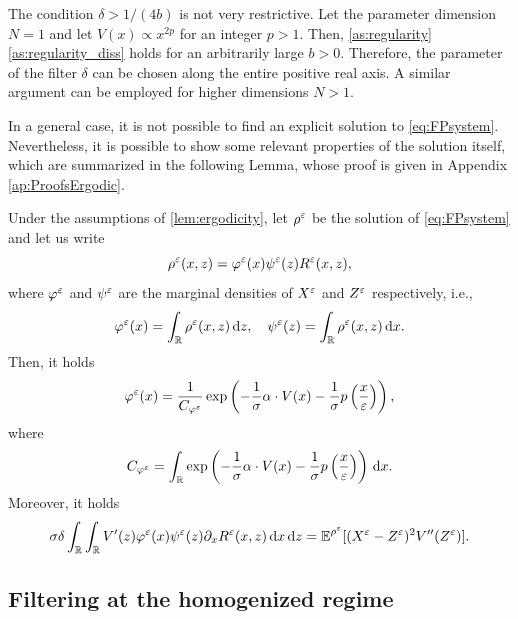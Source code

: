 \documentclass[review,onefignum,onetabnum]{siamonline190516}
\begin{document}
\begin{remark} The condition $\delta > 1 / (4b)$ is not very restrictive. Let the parameter dimension $N = 1$ and let $V(x) \propto x^{2p}$ for an integer $p > 1$. Then, \cref{as:regularity}\ref{as:regularity_diss} holds for an arbitrarily large $b > 0$. Therefore, the parameter of the filter $\delta$ can be chosen along the entire positive real axis. A similar argument can be employed for higher dimensions $N > 1$.
\end{remark}

In a general case, it is not possible to find an explicit solution to \eqref{eq:FPsystem}. Nevertheless, it is possible to show some relevant properties of the solution itself, which are summarized in the following Lemma, whose proof is given in Appendix \ref{ap:ProofsErgodic}.

\begin{lemma}\label{lem:FPMarginal} Under the assumptions of \cref{lem:ergodicity}, let $\rho^\varepsilon$ be the solution of \eqref{eq:FPsystem} and let us write 
\begin{equation}\label{eq:densityDecomposition}
	\rho^\epl(x, z) = \phi^\epl(x)\psi^\epl(z)R^\epl(x,z),
\end{equation}
where $\varphi^\varepsilon$ and $\psi^\varepsilon$ are the marginal densities of $X^\varepsilon$ and $Z^\varepsilon$ respectively, i.e., 
\begin{equation}
	\varphi^\varepsilon(x) = \int_{\mathbb{R}} \rho^\varepsilon(x,z) \,\mathrm{d} z, \quad  \psi^\varepsilon(z) = \int_{\mathbb{R}} \rho^\varepsilon(x,z) \,\mathrm{d} x.
\end{equation}
Then, it holds
\begin{equation}\label{eq:marginalX}
	\phi^\epl(x) = \frac{1}{C_{\phi^\epl}} \exp\left(-\frac{1}{\sigma} \alpha \cdot V(x) - \frac{1}{\sigma} p \left ( \frac{x}\epl \right )\right),
\end{equation}
where
\begin{equation}
	C_{\varphi^\varepsilon} = \int_{\mathbb{R}} \exp\left(-\frac{1}{\sigma} \alpha \cdot V(x) - \frac{1}{\sigma} p \left ( \frac{x}{\varepsilon} \right )\right) \,\mathrm{d} x.
\end{equation}
Moreover, it holds
\begin{equation}
	\sigma \delta \int_{\mathbb{R}} \int_{\mathbb{R}} V'(z) \varphi^\varepsilon(x) \psi^\varepsilon(z) \partial_x R^\varepsilon(x,z) \,\mathrm{d} x \,\mathrm{d} z = \operatorname{\mathbb{E}}^{\rho^\varepsilon}[(X^\varepsilon - Z^\varepsilon)^2 V''(Z^\varepsilon)].
\end{equation}
\end{lemma}

\subsection{Filtering at the homogenized regime}\label{sec:Slow}
\end{document}

